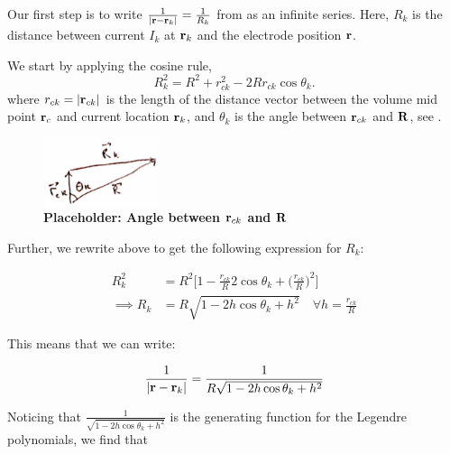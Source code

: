 Our first step is to write $\frac{1}{|{\bf r} - {\bf r}_k|} = \frac{1}{R_k}$ from  as an infinite series. Here, $R_k$ is the distance between current $I_k$ at ${\bf r}_k$ and the electrode position ${\bf r}$.

We start by applying the cosine rule,
\begin{equation}\label{eq:cos}
R_k^2 = R^2 + r_{ck}^2 - 2 R r_{ck} \cos \theta_k.
\end{equation}
where $r_{ck} = |{\bf r}_{ck}|$ is the length of the distance vector between the volume mid point ${\bf r}_c$ and current location ${\bf r}_k$, and $\theta_k$ is the angle between ${\bf r}_{ck}$ and ${\bf R}$, see .

\begin{figure}[!ht]
	\begin{center}
		\includegraphics[width=0.3\textwidth]{Figures/placeholder_appB2.png}
	\end{center}
	\caption{\textbf{Placeholder: Angle between ${\bf r}_{ck}$ and ${\bf R}$}}
	\label{fig:theta_k}
\end{figure}

Further, we rewrite  above to get the following expression for $R_k$:

\begin{align*}
R_k^2 &= R^2\big[1 -  \frac{r_{ck}}{R} 2 \cos \theta_k + \big(\frac{r_{ck}}{R}\big)^2  \big] \\
\implies R_k &= R\sqrt{1 - 2 h \cos \theta_k + h^2} \quad \forall h = \frac{r_{ck}}{R}
\end{align*}

%
This means that we can write:

\begin{equation*}
\frac{1}{|{\bf r} - {\bf r}_k|} = \frac{1}{R\sqrt{1 - 2 h \cos \theta_k + h^2}}
\end{equation*}

Noticing that $\frac{1}{\sqrt{1 - 2 h \cos \theta_k + h^2}}$ is the generating function for the Legendre polynomials, we find that

